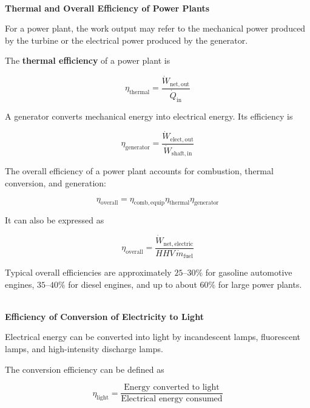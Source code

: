 \documentclass[12pt]{article}
\begin{document}
\textbf{\\ Thermal and Overall Efficiency of Power Plants}

For a power plant, the work output may refer to the mechanical power produced by the turbine or the electrical power produced by the generator.

The \textbf{thermal efficiency} of a power plant is

\begin{equation*}
\eta_{\mathrm{thermal}}
=
\frac{\dot{W}_{\mathrm{net,out}}}
{\dot{Q}_{\mathrm{in}}}
\end{equation*}

A generator converts mechanical energy into electrical energy. Its efficiency is

\begin{equation*}
\eta_{\mathrm{generator}}
=
\frac{\dot{W}_{\mathrm{elect,out}}}
{\dot{W}_{\mathrm{shaft,in}}}
\end{equation*}

The overall efficiency of a power plant accounts for combustion, thermal conversion, and generation:

\begin{equation*}
\eta_{\mathrm{overall}}
=
\eta_{\mathrm{comb,equip}}
\eta_{\mathrm{thermal}}
\eta_{\mathrm{generator}}
\end{equation*}

It can also be expressed as

\begin{equation*}
\eta_{\mathrm{overall}}
=
\frac{\dot{W}_{\mathrm{net,electric}}}
{HHV\,\dot{m}_{\mathrm{fuel}}}
\end{equation*}

Typical overall efficiencies are approximately $25$--$30\%$ for gasoline automotive engines, $35$--$40\%$ for diesel engines, and up to about $60\%$ for large power plants. 

\textbf{\\ Efficiency of Conversion of Electricity to Light}

Electrical energy can be converted into light by incandescent lamps, fluorescent lamps, and high-intensity discharge lamps.

The conversion efficiency can be defined as

\begin{equation*}
\eta_{\mathrm{light}}
=
\frac{\text{Energy converted to light}}
{\text{Electrical energy consumed}}
\end{equation*}
\end{document}
